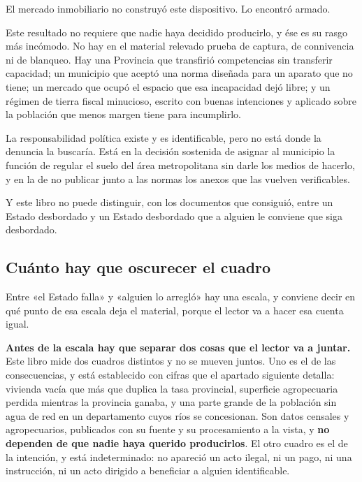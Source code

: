 El mercado inmobiliario no construyó este dispositivo. Lo encontró armado.

\begin{cautela}
Este resultado no requiere que nadie haya decidido producirlo, y ése es su rasgo más incómodo. No hay en el material relevado prueba de captura, de connivencia ni de blanqueo. Hay una Provincia que transfirió competencias sin transferir capacidad; un municipio que aceptó una norma diseñada para un aparato que no tiene; un mercado que ocupó el espacio que esa incapacidad dejó libre; y un régimen de tierra fiscal minucioso, escrito con buenas intenciones y aplicado sobre la población que menos margen tiene para incumplirlo.

La responsabilidad política existe y es identificable, pero no está donde la denuncia la buscaría. Está en la decisión sostenida de asignar al municipio la función de regular el suelo del área metropolitana sin darle los medios de hacerlo, y en la de no publicar junto a las normas los anexos que las vuelven verificables.

Y este libro no puede distinguir, con los documentos que consiguió, entre un Estado desbordado y un Estado desbordado que a alguien le conviene que siga desbordado.
\end{cautela}

\subsection*{Cuánto hay que oscurecer el cuadro}

Entre «el Estado falla» y «alguien lo arregló» hay una escala, y conviene decir en qué punto de
esa escala deja el material, porque el lector va a hacer esa cuenta igual.

\textbf{Antes de la escala hay que separar dos cosas que el lector va a juntar.} Este libro
mide dos cuadros distintos y no se mueven juntos. Uno es el de las consecuencias, y está
establecido con cifras que el apartado siguiente detalla: vivienda vacía que más que duplica la
tasa provincial, superficie agropecuaria perdida mientras la provincia ganaba, y una parte
grande de la población sin agua de red en un departamento cuyos ríos se concesionan. Son datos
censales y agropecuarios, publicados con su fuente y su procesamiento a la vista, y
\textbf{no dependen de que nadie haya querido producirlos}. El otro cuadro es el de la
intención, y está indeterminado: no apareció un acto ilegal, ni un pago, ni una instrucción, ni
un acto dirigido a beneficiar a alguien identificable.


